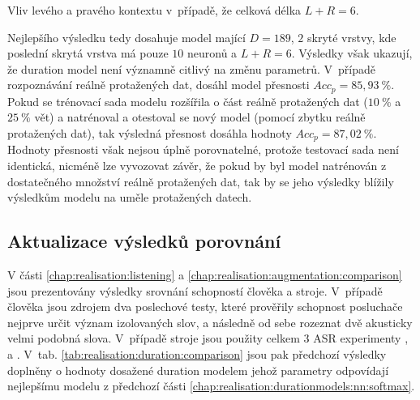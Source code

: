 \begin{table}[htpb]
  \centering
  \def\arraystretch{1.5}
  \caption{Vliv levého a pravého kontextu v~případě, že celková délka $L + R = 6$.}
  \label{tab:realisation:duration:context:asymetric}
\end{table}

Nejlepšího výsledku tedy dosahuje model mající $D = 189$, $2$ skryté vrstvy, kde poslední skrytá vrstva má pouze $10$ neuronů a $L + R = 6$. Výsledky však ukazují, že duration model není významně citlivý na změnu parametrů. V~případě rozpoznávání reálně protažených dat, dosáhl model přesnosti $Acc_{p} = 85,93~\%$. Pokud se trénovací sada modelu rozšířila o část reálně protažených dat ($10~\%$ a $25~\%$ vět) a natrénoval a otestoval se nový model (pomocí zbytku reálně protažených dat), tak výsledná přesnost dosáhla hodnoty $Acc_{p} = 87,02~\%$. Hodnoty přesnosti však nejsou úplně porovnatelné, protože testovací sada není identická, nicméně lze vyvozovat závěr, že pokud by byl model natrénován z dostatečného množství reálně protažených dat, tak by se jeho výsledky blížily výsledkům modelu na uměle protažených datech.


\subsection{Aktualizace výsledků porovnání}
\label{chap:realisation:duration:comparison}

V části \ref{chap:realisation:listening} a \ref{chap:realisation:augmentation:comparison} jsou prezentovány výsledky srovnání schopností člověka a stroje. V~případě člověka jsou zdrojem dva poslechové testy, které prověřily schopnost posluchače nejprve určit význam izolovaných slov, a následně od sebe rozeznat dvě akusticky velmi podobná slova. V~případě stroje jsou použity celkem $3$ ASR experimenty ,  a . V~tab. \ref{tab:realisation:duration:comparison} jsou pak předchozí výsledky doplněny o hodnoty dosažené duration modelem jehož parametry odpovídají nejlepšímu modelu z předchozí části \ref{chap:realisation:durationmodels:nn:softmax}.

